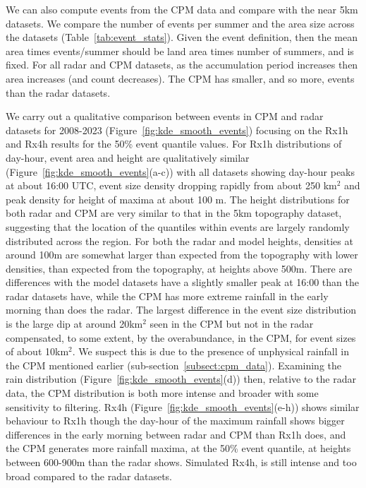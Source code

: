 \documentclass[11pt,a4paper]{article}
\begin{document}
 We can also compute events from the CPM data and compare with the near 5km datasets. We compare the number of events per summer and the area size across the datasets (Table~\ref{tab:event_stats}). Given the event definition, then the mean area times events/summer should be land area times number of summers, and is fixed. For all radar and CPM datasets, as the accumulation period increases then area increases (and count decreases). The CPM has smaller, and so more, events than the radar datasets. 
 
  We carry out a qualitative comparison between events in  CPM and radar datasets for 2008-2023 (Figure~\ref{fig:kde_smooth_events}) focusing on the Rx1h and Rx4h results for the 50\% event quantile values. 
  For Rx1h distributions of day-hour, event area and height are qualitatively similar  (Figure~\ref{fig:kde_smooth_events}(a-c)) with all datasets showing day-hour peaks at about 16:00 UTC, event size density dropping rapidly from about 250 km$^2$ and peak density for height of maxima at about 100 m.
   The height distributions for both radar and CPM are very similar to that in the 5km topography dataset, suggesting that the location of the quantiles within events are largely  randomly distributed across the region. 
    For both the radar and model heights, densities  at around 100m are somewhat larger than expected from the topography with lower densities, than expected from the topography, at heights above 500m. 
    There are differences with the model datasets have a slightly smaller peak at 16:00 than the radar datasets have, while the CPM has more extreme rainfall in the early morning than does the radar. The largest difference in the event size distribution is the large dip at around 20km$^2$ seen in the CPM but not in the radar compensated, to some extent, by the overabundance, in the CPM, for event sizes of about 10km$^2$. We suspect this is due to the presence of unphysical rainfall in the CPM mentioned earlier (sub-section~\ref{subsect:cpm_data}). 
     Examining the rain distribution (Figure~\ref{fig:kde_smooth_events}(d)) then, relative to the radar data, the CPM distribution is both more intense and broader with some sensitivity to filtering.  Rx4h (Figure~\ref{fig:kde_smooth_events}(e-h)) shows similar behaviour to Rx1h though the day-hour of the maximum rainfall shows bigger differences in the early morning between radar and CPM than Rx1h does, and the CPM generates more rainfall maxima, at the 50\% event quantile,  at heights  between 600-900m than the radar shows.  Simulated Rx4h, is still intense and too broad compared to the radar datasets. 
\end{document}
